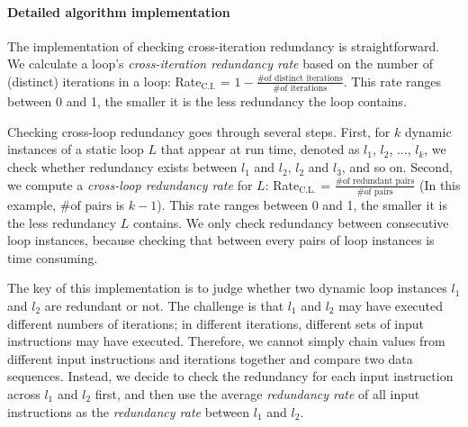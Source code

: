 


\paragraph{Detailed algorithm implementation}

The implementation of checking cross-iteration redundancy is straightforward.
We calculate a loop's \textit{cross-iteration redundancy rate} based on
the number of (distinct) iterations in a loop:
Rate$_\text{C.I.}$ = $1 - \frac{\text{\# of distinct iterations}}{\text{\# of iterations}}$.
This rate ranges between 0 and 1, the smaller it is
the less redundancy the loop contains.

Checking cross-loop redundancy goes through several
steps. First, for $k$ dynamic instances of a static loop $L$ that appear
at run time, denoted as $l_1$, $l_2$,
..., $l_k$, we check whether redundancy exists between $l_1$ and $l_2$, 
$l_2$ and $l_3$, and so on. Second, we compute a 
\textit{cross-loop redundancy rate} for $L$:
Rate$_\text{C.L.}$ = $\frac{\text{\# of redundant pairs}}{\text{\# of pairs}}$
(In this example, $\text{\# of pairs}$ is $k-1$).
This rate ranges between 0 and 1, the smaller it is the less redundancy
$L$ contains.
We only check redundancy between consecutive loop instances, because  
checking that between every pairs of loop
instances is time consuming.



The key of this implementation is
to judge whether two dynamic loop instances $l_1$ and $l_2$ 
are redundant or not.
The challenge is that $l_1$ and $l_2$ may have executed different numbers of
iterations; in different iterations, different sets of input instructions
may have executed. Therefore, we cannot simply chain values from different
input instructions and iterations together and compare two data sequences.
Instead, we decide to check the redundancy for each input instruction across
$l_1$ and $l_2$ first, and then use the average \textit{redundancy rate} of
all input instructions as the \textit{redundancy rate} between
$l_1$ and $l_2$. 

